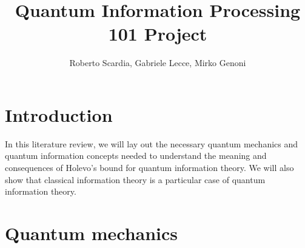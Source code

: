 \documentclass[journal, letterpaper]{IEEEtran}
\begin{document}
    
	\title{%
                Quantum Information Processing 101 Project
            }

	\author{Roberto Scardia, Gabriele Lecce, Mirko Genoni}
	\maketitle

\section{Introduction}
In this literature review, we will lay out the necessary quantum mechanics and quantum information concepts needed to understand the meaning and consequences of Holevo's bound for quantum information theory. We will also show that classical information theory is a particular case of quantum information theory.
    
\section{Quantum mechanics}
\end{document}
